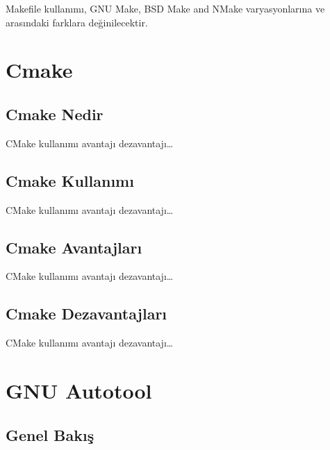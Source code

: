 \documentclass[
]{book}
\begin{document}
Makefile kullanımı, GNU Make, BSD Make and NMake varyasyonlarına ve arasındaki farklara değinilecektir.

\hypertarget{cmake}{%
\chapter{Cmake}\label{cmake}}

\hypertarget{cmake-nedir}{%
\section{Cmake Nedir}\label{cmake-nedir}}

CMake kullanımı avantajı dezavantajı\ldots{}

\hypertarget{cmake-kullanux131mux131}{%
\section{Cmake Kullanımı}\label{cmake-kullanux131mux131}}

CMake kullanımı avantajı dezavantajı\ldots{}

\hypertarget{cmake-avantajlarux131}{%
\section{Cmake Avantajları}\label{cmake-avantajlarux131}}

CMake kullanımı avantajı dezavantajı\ldots{}

\hypertarget{cmake-dezavantajlarux131}{%
\section{Cmake Dezavantajları}\label{cmake-dezavantajlarux131}}

CMake kullanımı avantajı dezavantajı\ldots{}

\hypertarget{gnu-autotool}{%
\chapter{GNU Autotool}\label{gnu-autotool}}

\hypertarget{genel-bakux131ux15f}{%
\section{Genel Bakış}\label{genel-bakux131ux15f}}
\end{document}
